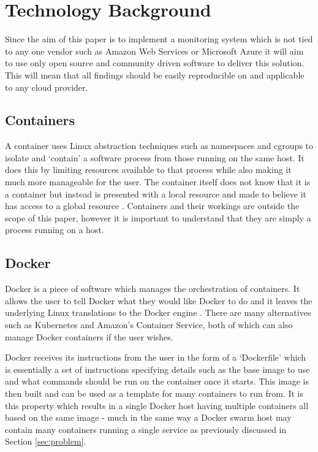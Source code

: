 \section{Technology Background}
\label{sec:tech}
Since the aim of this paper is to implement a monitoring system which is not tied to any one vendor such as Amazon Web Services or Microsoft Azure it will aim to use only open source and community driven software to deliver this solution. This will mean that all findings should be easily reproducible on and applicable to any cloud provider.

\subsection{Containers}
A container uses Linux abstraction techniques such as namespaces and cgroups to isolate and `contain' a software process from those running on the same host. It does this by limiting resources available to that process while also making it much more manageable for the user. The container itself does not know that it is a container but instead is presented with a local resource and made to believe it has access to a global resource \citep{Kerrisk2013}. Containers and their workings are outside the scope of this paper, however it is important to understand that they are simply a process running on a host.

\subsection{Docker}
Docker is a piece of software which manages the orchestration of containers. It allows the user to tell Docker what they would like Docker to do and it leaves the underlying Linux translations to the Docker engine \citep{docker2016}. There are many alternatives such as Kubernetes and Amazon's Container Service, both of which can also manage Docker containers if the user wishes.

Docker receives its instructions from the user in the form of a `Dockerfile' which is essentially a set of instructions specifying details such as the base image to use and what commands should be run on the container once it starts. This image is then built and can be used as a template for many containers to run from. It is this property which results in a single Docker host having multiple containers all based on the same image - much in the same way a Docker swarm host may contain many containers running a single service as previously discussed in Section \ref{sec:problem}.

